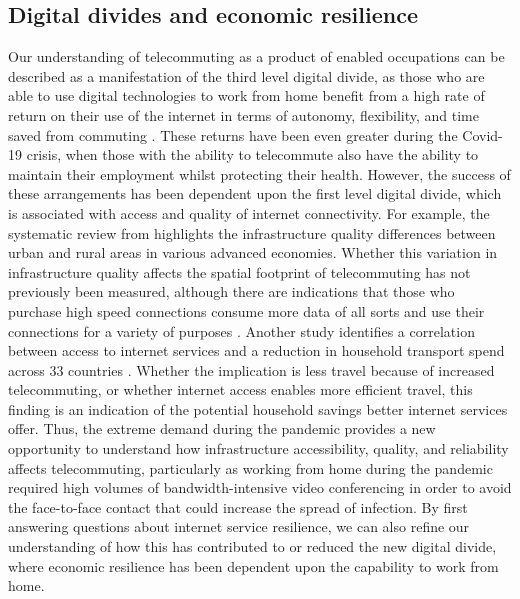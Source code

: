 \documentclass[]{interact}
\theoremstyle{plain}%
\theoremstyle{definition}
\theoremstyle{remark}
\begin{document}
\hypertarget{digital-divides-and-economic-resilience}{%
\subsection{Digital divides and economic
resilience}\label{digital-divides-and-economic-resilience}}

Our understanding of telecommuting as a product of enabled occupations
can be described as a manifestation of the third level digital divide,
as those who are able to use digital technologies to work from home
benefit from a high rate of return on their use of the internet in terms
of autonomy, flexibility, and time saved from commuting
\citep{peters2004employees, siha2006telecommuting, singh2013modeling}.
These returns have been even greater during the Covid-19 crisis, when
those with the ability to telecommute also have the ability to maintain
their employment whilst protecting their health. However, the success of
these arrangements has been dependent upon the first level digital
divide, which is associated with access and quality of internet
connectivity. For example, the systematic review from
\citet{SALEMINK2017360} highlights the infrastructure quality
differences between urban and rural areas in various advanced economies.
Whether this variation in infrastructure quality affects the spatial
footprint of telecommuting has not previously been measured, although
there are indications that those who purchase high speed connections
consume more data of all sorts and use their connections for a variety
of purposes \citep{hauge2011consumer}. Another study identifies a
correlation between access to internet services and a reduction in
household transport spend across 33 countries \citep{bris2017ict}.
Whether the implication is less travel because of increased
telecommuting, or whether internet access enables more efficient travel,
this finding is an indication of the potential household savings better
internet services offer. Thus, the extreme demand during the pandemic
provides a new opportunity to understand how infrastructure
accessibility, quality, and reliability affects telecommuting,
particularly as working from home during the pandemic required high
volumes of bandwidth-intensive video conferencing in order to avoid the
face-to-face contact that could increase the spread of infection. By
first answering questions about internet service resilience, we can also
refine our understanding of how this has contributed to or reduced the
new digital divide, where economic resilience has been dependent upon
the capability to work from home.
\end{document}
